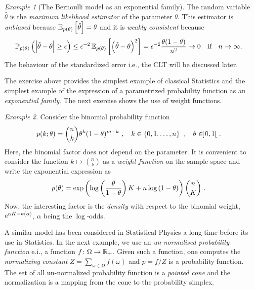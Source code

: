 \documentclass[12pt,a4paper]{amsart}
\theoremstyle{plain}%
\theoremstyle{definition}
\theoremstyle{remark}
\newtheorem{example}{Example}
\begin{document}
\begin{example}[The Bernoulli model as an exponential family]
The random variable $\hat \theta$ is the \emph{maximum likelihood estimator} of the parameter $\theta$. This estimator is \emph{unbiased} because $\operatorname{\mathbb E}_{p(\theta)}\left[\hat \theta\right] = \theta$ and it is \emph{weakly consistent} because
\begin{equation*}
\operatorname{\mathbb P}_{p(\theta)}\left(\left\vert\hat \theta - \theta\right\vert \geq \epsilon\right) \leq \epsilon^{-2} \operatorname{\mathbb E}_{p(\theta)}\left[\left(\hat \theta - \theta\right)^2\right] = \epsilon^{-2} \frac{\theta(1-\theta)}{n^2} \to 0 \quad \text{if} \quad n\to\infty .
\end{equation*}
The behaviour of the standardized error i.e., the CLT will be discussed later.
\end{example}

The exercise above provides the simplest example of classical Statistics and the simplest example of the expression of a parametrized probability function as an \emph{exponential family}. The next exercise shows the use of weight functions. 
\begin{example}
Consider the binomial probability function
\begin{equation*}
  p(k;\theta) = \binom n k \theta^k (1-\theta)^{m-k} \ , \quad k \in \left\{0,1,\dots,n\right\} \ , \quad \theta \in ]0,1[ \ .
\end{equation*}
Here, the binomial factor does not depend on the parameter. It is convenient to consider the function $k \mapsto \binom n k$ as a \emph{weight function} on the sample space and write the exponential expression as
\begin{equation*}
  p(\theta) = \exp\left(\log\left(\frac{\theta}{1-\theta}\right) K + n \log\left(1-\theta\right)\right) \binom n K \ .
\end{equation*}
Now, the interesting factor is the \emph{density} with respect to the binomial weight, $\mathrm{e}^{\alpha K - \kappa(\alpha)}$, $\alpha$ being the $\log$-odds.
\end{example}

A similar model has been considered in Statistical Physics a long time before its use in Statistics. In the next example, we use an \emph{un-normalised probability function} e.i., a function $f \colon \Omega \to \mathbb{R}_+$. Given such a function, one computes the \emph{normalizing constant} $Z = \sum_{\omega\in\Omega} f(\omega)$ and $p = f/Z$ is a probability function. The set of all un-normalized probability function is a \emph{pointed cone} and the normalization is a mapping from the cone to the probability simplex.
\end{document}
